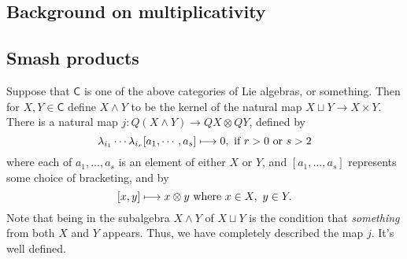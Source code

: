 \documentclass[10pt]{article}
\begin{document}
\begin{backgroundOnMultiplicativity}
\section{Background on multiplicativity}
\subsection{Smash products}
Suppose that $\mathsf{C}$ is one of the above categories of Lie algebras, or something. Then for $X,Y\in\mathsf{C}$ define $X\wedge Y$ to be the kernel of the natural map $X\sqcup Y\to X\times Y$. There is a natural map $j:Q(X\wedge Y)\to QX\otimes QY$, defined by
\[\lambda_{i_1}\cdots \lambda_{i_r}[a_1,\cdots ,a_s]\mapsto0,\textup{ if }r>0\textup{ or }s>2
\]
where each of $a_1,\ldots,a_s$ is an element of either $X$ or $Y$, and $[a_1,\ldots,a_s]$ represents some choice of bracketing, and by
\[[x,y]\mapsto x\otimes y\textup{ where }x\in X,\ y\in Y.\]
 Note that being in the subalgebra $X\wedge Y$ of $X\sqcup Y$ is the condition that \emph{something} from both $X$ and $Y$ appears. Thus, we have completely described the map $j$. It's well defined.

\end{backgroundOnMultiplicativity}
\end{document}
